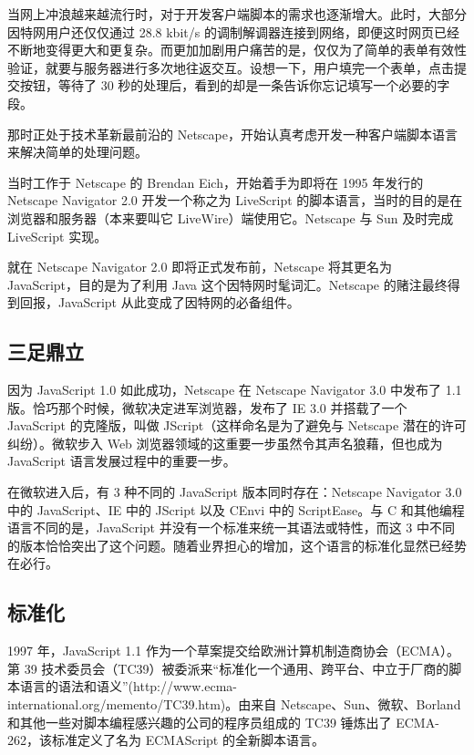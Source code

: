 \documentclass[a4paper,11pt]{book}
\begin{document}
当网上冲浪越来越流行时，对于开发客户端脚本的需求也逐渐增大。此时，大部分因特网用户还仅仅通过 28.8 kbit/s 的调制解调器连接到网络，即便这时网页已经不断地变得更大和更复杂。而更加加剧用户痛苦的是，仅仅为了简单的表单有效性验证，就要与服务器进行多次地往返交互。设想一下，用户填完一个表单，点击提交按钮，等待了 30 秒的处理后，看到的却是一条告诉你忘记填写一个必要的字段。

那时正处于技术革新最前沿的 Netscape，开始认真考虑开发一种客户端脚本语言来解决简单的处理问题。

当时工作于 Netscape 的 Brendan Eich，开始着手为即将在 1995 年发行的 Netscape Navigator 2.0 开发一个称之为 LiveScript 的脚本语言，当时的目的是在浏览器和服务器（本来要叫它 LiveWire）端使用它。Netscape 与 Sun 及时完成 LiveScript 实现。

就在 Netscape Navigator 2.0 即将正式发布前，Netscape 将其更名为 JavaScript，目的是为了利用 Java 这个因特网时髦词汇。Netscape 的赌注最终得到回报，JavaScript 从此变成了因特网的必备组件。


\subsection{三足鼎立}

因为 JavaScript 1.0 如此成功，Netscape 在 Netscape Navigator 3.0 中发布了 1.1 版。恰巧那个时候，微软决定进军浏览器，发布了 IE 3.0 并搭载了一个 JavaScript 的克隆版，叫做 JScript（这样命名是为了避免与 Netscape 潜在的许可纠纷）。微软步入 Web 浏览器领域的这重要一步虽然令其声名狼藉，但也成为 JavaScript 语言发展过程中的重要一步。

在微软进入后，有 3 种不同的 JavaScript 版本同时存在：Netscape Navigator 3.0 中的 JavaScript、IE 中的 JScript 以及 CEnvi 中的 ScriptEase。与 C 和其他编程语言不同的是，JavaScript 并没有一个标准来统一其语法或特性，而这 3 中不同的版本恰恰突出了这个问题。随着业界担心的增加，这个语言的标准化显然已经势在必行。

\subsection{标准化}

1997 年，JavaScript 1.1 作为一个草案提交给欧洲计算机制造商协会（ECMA）。第 39 技术委员会（TC39）被委派来“标准化一个通用、跨平台、中立于厂商的脚本语言的语法和语义”(http://www.ecma-international.org/memento/TC39.htm)。由来自 Netscape、Sun、微软、Borland 和其他一些对脚本编程感兴趣的公司的程序员组成的 TC39 锤炼出了 ECMA-262，该标准定义了名为 ECMAScript 的全新脚本语言。
\end{document}
